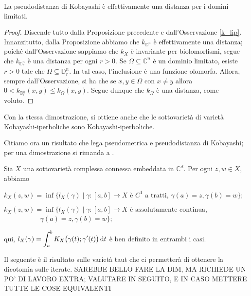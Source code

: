 \begin{cor}
    La pseudodistanza di Kobayashi è effettivamente una distanza per i domini limitati.
\end{cor}
\begin{proof}
    Discende tutto dalla Proposizione precedente e dall'Osservazione \ref{k_lip}. Innanzitutto, dalla Proposizione abbiamo che $k_{\mathbb{D}^n}$ è effettivamente una distanza; poiché dall'Osservazione sappiamo che $k_X$ è invariante per biolomorfismi, segue che $k_{\mathbb{D}_r^n}$ è una distanza per ogni $r>0$. Se $\Omega\subseteq\mathbb{C}^n$ è un dominio limitato, esiste $r>0$ tale che $\Omega\subseteq\mathbb{D}_r^n$. In tal caso, l'inclusione è una funzione olomorfa. Allora, sempre dall'Osservazione, si ha che se $x,y \in \Omega$ con $x\not=y$ allora $0<k_{\mathbb{D}_r^n}(x,y) \le k_{\Omega}(x,y)$. Segue dunque che $k_\Omega$ è una distanza, come voluto.
\end{proof}

\begin{oss}
    Con la stessa dimostrazione, si ottiene anche che le sottovarietà di varietà Kobayashi-iperboliche sono Kobayashi-iperboliche.
\end{oss}

Citiamo ora un risultato che lega pseudometrica e pseudodistanza di Kobayashi; per una dimostrazione si rimanda a \cite{R}.

\begin{thm}
    \cite[Result 2.1]{CMS} Sia $X$ una sottovarietà complessa connessa embeddata in $\mathbb{C}^d$. Per ogni $z,w \in X$, abbiamo
    \begin{nlist}
        \item $k_X(z,w)=\inf\{l_X(\gamma) \mid \gamma:[a,b] \longrightarrow X\text{ è $C^1$ a tratti, }\gamma(a)=z,\gamma(b)=w\}$;
        \item $k_X(z,w)=\inf\{l_X(\gamma) \mid \gamma:[a,b] \longrightarrow X\text{ è assolutamente continua,}$\\
        $\text{    }\qquad\qquad\,\,\,\,\gamma(a)=z,\gamma(b)=w\}$;
    \end{nlist}
    qui, $l_X(\gamma)=\displaystyle\int_a^b K_X\big(\gamma(t);\gamma'(t)\big)\mathop{}\!\mathrm{d} t$ è ben definito in entrambi i casi.
\end{thm}

Il seguente è il risultato sulle varietà taut che ci permetterà di ottenere la dicotomia sulle iterate. SAREBBE BELLO FARE LA DIM, MA RICHIEDE UN PO' DI LAVORO EXTRA; VALUTARE IN SEGUITO, E IN CASO METTERE TUTTE LE COSE EQUIVALENTI


